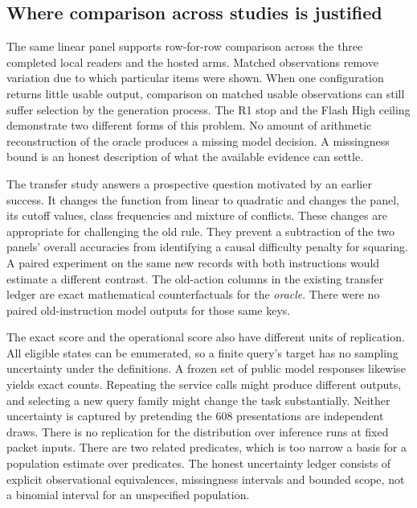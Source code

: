 \documentclass[12pt,letterpaper]{article}
\begin{document}
\subsection{Where comparison across studies is justified}
The same linear panel supports row-for-row comparison across the three completed local readers and the hosted arms. Matched observations remove variation due to which particular items were shown. When one configuration returns little usable output, comparison on matched usable observations can still suffer selection by the generation process. The R1 stop and the Flash High ceiling demonstrate two different forms of this problem. No amount of arithmetic reconstruction of the oracle produces a missing model decision. A missingness bound is an honest description of what the available evidence can settle.

The transfer study answers a prospective question motivated by an earlier success. It changes the function from linear to quadratic and changes the panel, its cutoff values, class frequencies and mixture of conflicts. These changes are appropriate for challenging the old rule. They prevent a subtraction of the two panels' overall accuracies from identifying a causal difficulty penalty for squaring. A paired experiment on the same new records with both instructions would estimate a different contrast. The old-action columns in the existing transfer ledger are exact mathematical counterfactuals for the \emph{oracle}. There were no paired old-instruction model outputs for those same keys.

The exact score and the operational score also have different units of replication. All eligible states can be enumerated, so a finite query's target has no sampling uncertainty under the definitions. A frozen set of public model responses likewise yields exact counts. Repeating the service calls might produce different outputs, and selecting a new query family might change the task substantially. Neither uncertainty is captured by pretending the 608 presentations are independent draws. There is no replication for the distribution over inference runs at fixed packet inputs. There are two related predicates, which is too narrow a basis for a population estimate over predicates. The honest uncertainty ledger consists of explicit observational equivalences, missingness intervals and bounded scope, not a binomial interval for an unspecified population.
\end{document}

